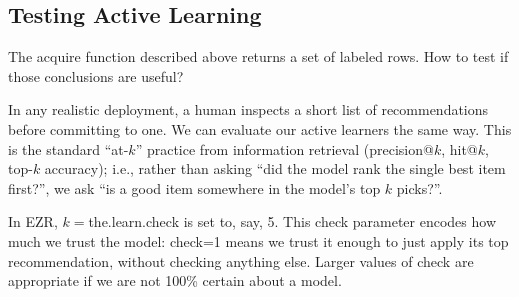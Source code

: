 \documentclass[AMA,STIX2COL]{WileyNJDv5}
\begin{document}
 
 \subsection{Testing Active Learning}
The \textsf{acquire} function described above returns a set of labeled
rows. How to test if those conclusions are useful? 

In any realistic 
deployment, a human inspects a short list of recommendations before 
committing to one.
We can evaluate our active learners the same way. This is the standard 
``at-$k$'' practice from information retrieval (precision@$k$, 
hit@$k$, top-$k$ accuracy);
i.e., rather than asking ``did the model rank 
the single best item first?'', we ask ``is a good item somewhere in 
the model's top $k$ picks?''.

In EZR,  $k=$\textsf{the.learn.check} is set to, say, 5.
This \textsf{check} parameter  encodes how much we trust the model: 
\textsf{check}=1 means we trust it enough to just apply its
top recommendation, without checking anything else.
Larger 
values of \textsf{check} are appropriate if we are not 100\% certain about a model.
\end{document}
